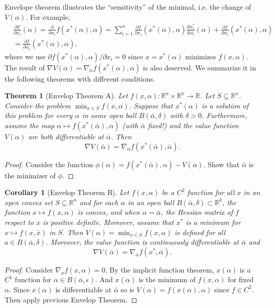 \documentclass[12pt,a4paper]{report}
\numberwithin{equation}{section}
\theoremstyle{mystyle}
\newtheorem{theorem}[definition]{Theorem}
\newtheorem{corollary}[definition]{Corollary}
\newcommand{\R}{\mathbb{R}}
\newcommand{\grad}{\nabla}
\renewcommand{\d}{\mathrm{d}}
\begin{document}
	Envelope theorem illustrates the ``sensitivity'' of the minimal, i.e. the change of $V(\alpha)$. For example,
	\begin{align*}
		&\frac{\partial V}{\partial \alpha_i}(\alpha)=\frac{\partial }{\partial \alpha_i}f(x^*(\alpha),\alpha)
		=\sum_{i=1}^n \frac{\partial f}{\partial x_i}(x^*(\alpha),\alpha)\frac{\d x_i^*}{\d \alpha_i}(\alpha)
		+
		\frac{\partial f}{\partial \alpha_i}(x^*(\alpha),\alpha)\\
		&=\frac{\partial f}{\partial \alpha_i}(x^*(\alpha),\alpha),
	\end{align*}
	where we use $\partial f(x^*(\alpha),\alpha)/\partial x_i=0$ since $x=x^*(\alpha)$ minimizes $f(x,\alpha).$ The result of $\grad V(\alpha)=\grad_\alpha f(x^*(\alpha),\alpha)$ is also deserved. We summarize it in the following theorems with different conditions.
	\begin{theorem}[Envelop Theorem A]
		Let $f(x,\alpha): \R^n\times \R^k\to \R$. Let $S\subseteq \R^n$. Consider the problem $\min_{x\in S}f(x,\alpha)$. Suppose that $x^*(\alpha)$ is a solution of this problem for every $\alpha$ in some open ball $B(\bar{\alpha},\delta)$ with $\delta>0$. Furthermore, assume the map $\alpha\mapsto f(x^*(\bar{\alpha}),\alpha)$ (with $\bar{\alpha}$ fixed!) and the value function $V(\alpha)$ are both differentiable at $\bar{\alpha}$. Then 
		$$
		\grad V(\bar{\alpha})=\grad_\alpha f(x^*(\bar{\alpha}),\bar{\alpha}).
		$$
	\end{theorem} 
	\begin{proof}
		Consider the function $\phi(\alpha)=f(x^*(\bar{\alpha}),\alpha)-V(\alpha)$. Show that $\bar{\alpha}$ is the minimizer of $\phi$.
	\end{proof}
	
	\begin{corollary}[Envelop Theorem B]
		Let $f(x,\alpha)$ be a $C^2$ function for all $x$ in an open convex set $S\subseteq \R^n$ and for each $\alpha$ in an open ball $B(\bar{\alpha},\delta)\subset \R^k$, the function $x\mapsto f(x,\alpha)$ is convex, and when $\alpha=\bar{\alpha}$, the Hessian matrix of $f$ respect to $x$ is positive definite. Moreover, assume that $x^*$ is a minimum for $x\mapsto f(x,\bar{x})$ in $S$. Then $V(\alpha)=\min_{x\in S}f(x,\alpha)$ is defined for all $a\in B(\bar{\alpha},\delta) $. Moreover, the value function is continuously differentiable at $\bar{\alpha}$ and
		$$
		\grad V(\bar{\alpha})=\grad_\alpha f(x^*,\bar{\alpha}).
		$$
	\end{corollary}
	\begin{proof}
		Consider $\grad_x f(x,\alpha)=0$. By the implicit function theorem, $x(\alpha)$ is a $C^1$ function for $\alpha\in B(\bar{\alpha},\epsilon)$. And $x(\alpha)$ is the minimum of $f(x,\alpha)$ for fixed $\alpha$. Since $x(\alpha)$ is differentiable at $\bar{\alpha}$ so is $V(\alpha)=f(x(\alpha),\alpha)$ since $f\in C^2$. Then apply previous Envelop Theorem.
	\end{proof}
\end{document}
